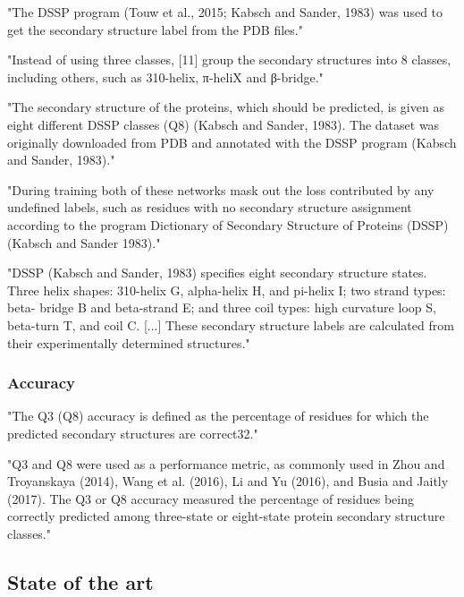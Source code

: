   "The DSSP program (Touw et al., 2015; Kabsch and Sander, 1983) was used to get the secondary structure label from the PDB files." \cite{Fang2017}

  "Instead of using three classes, [11] group the secondary structures into 8 classes, including others, such as 310-helix, π-heliX and β-bridge." \cite{Hattori2017}

  "The secondary structure of the proteins, which should be predicted, is given as eight different DSSP classes (Q8) (Kabsch and Sander, 1983). The dataset was originally downloaded from PDB and annotated with the DSSP program (Kabsch and Sander, 1983)." \cite{Jurtz2017}

  "During training both of these networks mask out the loss contributed by any undefined labels, such as residues with no secondary structure assignment according to the program Dictionary of Secondary Structure of Proteins (DSSP) (Kabsch and Sander 1983)." \cite{Heffernan2017}

  "DSSP (Kabsch and Sander, 1983) specifies eight secondary structure states. Three helix shapes: 310-helix G, alpha-helix H, and pi-helix I; two strand types: beta- bridge B and beta-strand E; and three coil types: high curvature loop S, beta-turn T, and coil C. [...] These secondary structure labels are calculated from their experimentally determined structures." \cite{Heffernan2017}

  \subsubsection{Accuracy}
  "The Q3 (Q8) accuracy is defined as the percentage of residues for which the predicted secondary structures are correct32." \cite{Wang2016}

  "Q3 and Q8 were used as a performance metric, as commonly used in Zhou and Troyanskaya (2014), Wang et al. (2016), Li and Yu (2016), and Busia and Jaitly (2017). The Q3 or Q8 accuracy measured the percentage of residues being correctly predicted among three-state or eight-state protein secondary structure classes." \cite{Fang2017}

 \subsection{State of the art}

